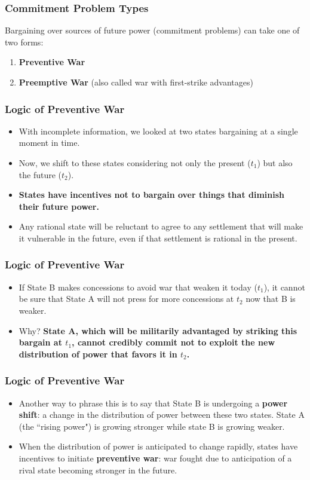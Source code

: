 \documentclass{beamer}
\begin{document}
\begin{frame} 
	\frametitle{\LARGE{Commitment Problem Types}}
	Bargaining over sources of future power (commitment problems) can take one of two forms:
	\begin{enumerate}
		\item \textbf{Preventive War} 
		\item\textbf{Preemptive War} (also called war with first-strike advantages)
	\end{enumerate}

\end{frame}

\begin{frame} 
	\frametitle{\LARGE{Logic of Preventive War}}
	\begin{itemize}
		\item With incomplete information, we looked at two states bargaining at a single moment in time. 
		\item Now, we shift to these states considering not only the present ($t_1$) but also the future ($t_2$). \pause
		\item \textbf{States have incentives not to bargain over things that diminish their future power.} \pause 
		\item Any rational state will be reluctant to agree to any settlement that will make it vulnerable in the future, even if that settlement is rational in the present.  
	\end{itemize}
\end{frame}

\begin{frame} 
	\frametitle{\LARGE{Logic of Preventive War}}
	\begin{itemize}
		\item If State B makes concessions to avoid war that weaken it today ($t_1$), it cannot be sure that State A will not press for more concessions at $t_2$ now that B is weaker. \pause
		\item Why? \textbf{State A, which will be militarily advantaged by striking this bargain at $t_1$, cannot credibly commit not to exploit the new distribution of power that favors it in $t_2$.}
	\end{itemize}
\end{frame}

\begin{frame} 
	\frametitle{\LARGE{Logic of Preventive War}}
	\begin{itemize}
		\item Another way to phrase this is to say that State B is undergoing a \textbf{power shift}: a  change in the distribution of power between these two states. State A (the ``rising power") is growing stronger while state B is growing weaker. \pause
		\item When the distribution of power is anticipated to change rapidly, states have incentives to initiate \textbf{preventive war}: war fought due to anticipation of a rival state becoming stronger in the future.  
	\end{itemize}
\end{frame}
\end{document}
